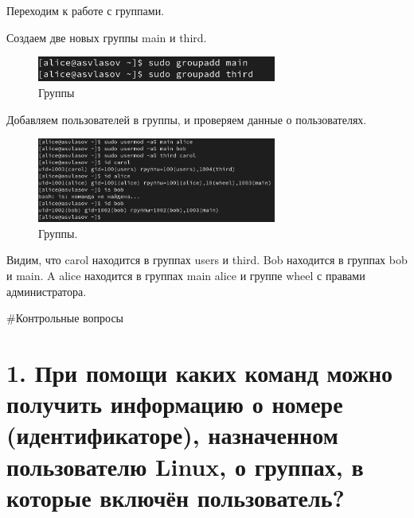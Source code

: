 \documentclass[
  12pt,
  a4paper,
  DIV=11,
  numbers=noendperiod]{scrreprt}
\begin{document}
Переходим к работе с группами.

Создаем две новых группы main и third.

\begin{figure}

{\centering \includegraphics[width=0.7\textwidth,height=\textheight]{image/16.png}

}

\caption{Группы}

\end{figure}%

Добавляем пользователей в группы, и проверяем данные о пользователях.

\begin{figure}

{\centering \includegraphics[width=0.7\textwidth,height=\textheight]{image/17.png}

}

\caption{Группы.}

\end{figure}%

Видим, что carol находится в группах users и third. Bob находится в
группах bob и main. A alice находится в группах main alice и группе
wheel с правами администратора.

\#Контрольные вопросы

\section{1. При помощи каких команд можно получить информацию о номере
(идентификаторе), назначенном пользователю Linux, о группах, в которые
включён
пользователь?}\label{ux43fux440ux438-ux43fux43eux43cux43eux449ux438-ux43aux430ux43aux438ux445-ux43aux43eux43cux430ux43dux434-ux43cux43eux436ux43dux43e-ux43fux43eux43bux443ux447ux438ux442ux44c-ux438ux43dux444ux43eux440ux43cux430ux446ux438ux44e-ux43e-ux43dux43eux43cux435ux440ux435-ux438ux434ux435ux43dux442ux438ux444ux438ux43aux430ux442ux43eux440ux435-ux43dux430ux437ux43dux430ux447ux435ux43dux43dux43eux43c-ux43fux43eux43bux44cux437ux43eux432ux430ux442ux435ux43bux44e-linux-ux43e-ux433ux440ux443ux43fux43fux430ux445-ux432-ux43aux43eux442ux43eux440ux44bux435-ux432ux43aux43bux44eux447ux451ux43d-ux43fux43eux43bux44cux437ux43eux432ux430ux442ux435ux43bux44c}
\end{document}
